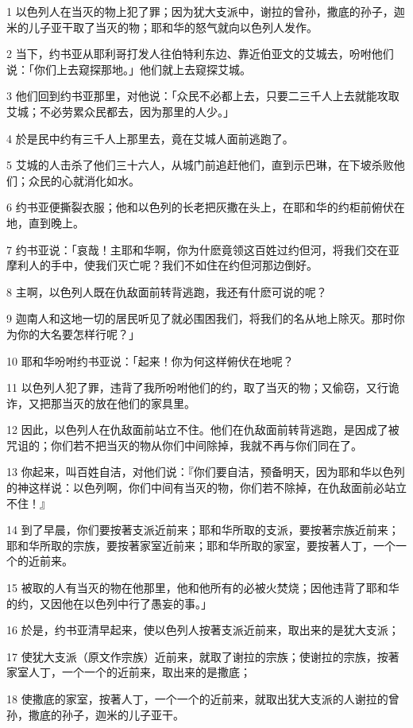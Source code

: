 \par 1 以色列人在当灭的物上犯了罪；因为犹大支派中，谢拉的曾孙，撒底的孙子，迦米的儿子亚干取了当灭的物；耶和华的怒气就向以色列人发作。
\par 2 当下，约书亚从耶利哥打发人往伯特利东边、靠近伯亚文的艾城去，吩咐他们说：「你们上去窥探那地。」他们就上去窥探艾城。
\par 3 他们回到约书亚那里，对他说：「众民不必都上去，只要二三千人上去就能攻取艾城；不必劳累众民都去，因为那里的人少。」
\par 4 於是民中约有三千人上那里去，竟在艾城人面前逃跑了。
\par 5 艾城的人击杀了他们三十六人，从城门前追赶他们，直到示巴琳，在下坡杀败他们；众民的心就消化如水。
\par 6 约书亚便撕裂衣服；他和以色列的长老把灰撒在头上，在耶和华的约柜前俯伏在地，直到晚上。
\par 7 约书亚说：「哀哉！主耶和华啊，你为什麽竟领这百姓过约但河，将我们交在亚摩利人的手中，使我们灭亡呢？我们不如住在约但河那边倒好。
\par 8 主啊，以色列人既在仇敌面前转背逃跑，我还有什麽可说的呢？
\par 9 迦南人和这地一切的居民听见了就必围困我们，将我们的名从地上除灭。那时你为你的大名要怎样行呢？」
\par 10 耶和华吩咐约书亚说：「起来！你为何这样俯伏在地呢？
\par 11 以色列人犯了罪，违背了我所吩咐他们的约，取了当灭的物；又偷窃，又行诡诈，又把那当灭的放在他们的家具里。
\par 12 因此，以色列人在仇敌面前站立不住。他们在仇敌面前转背逃跑，是因成了被咒诅的；你们若不把当灭的物从你们中间除掉，我就不再与你们同在了。
\par 13 你起来，叫百姓自洁，对他们说：『你们要自洁，预备明天，因为耶和华以色列的神这样说：以色列啊，你们中间有当灭的物，你们若不除掉，在仇敌面前必站立不住！』
\par 14 到了早晨，你们要按著支派近前来；耶和华所取的支派，要按著宗族近前来；耶和华所取的宗族，要按著家室近前来；耶和华所取的家室，要按著人丁，一个一个的近前来。
\par 15 被取的人有当灭的物在他那里，他和他所有的必被火焚烧；因他违背了耶和华的约，又因他在以色列中行了愚妄的事。」
\par 16 於是，约书亚清早起来，使以色列人按著支派近前来，取出来的是犹大支派；
\par 17 使犹大支派（原文作宗族）近前来，就取了谢拉的宗族；使谢拉的宗族，按著家室人丁，一个一个的近前来，取出来的是撒底；
\par 18 使撒底的家室，按著人丁，一个一个的近前来，就取出犹大支派的人谢拉的曾孙，撒底的孙子，迦米的儿子亚干。
